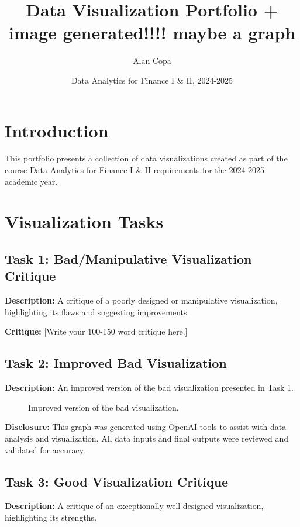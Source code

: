 \documentclass[a4paper,landscape]{article}
\title{Data Visualization Portfolio + image generated!!!! maybe a graph}
\author{Alan Copa}
\date{Data Analytics for Finance I \& II, 2024-2025}
\begin{document}
\maketitle

\tableofcontents
\newpage

\section{Introduction}
This portfolio presents a collection of data visualizations created as part of the course Data Analytics for Finance I \& II requirements for the 2024-2025 academic year.

\section{Visualization Tasks}

\subsection{Task 1: Bad/Manipulative Visualization Critique}
\textbf{Description:} A critique of a poorly designed or manipulative visualization, highlighting its flaws and suggesting improvements.

\textbf{Critique:}
[Write your 100-150 word critique here.]

\subsection{Task 2: Improved Bad Visualization}
\textbf{Description:} An improved version of the bad visualization presented in Task 1.

\begin{figure}[H]
    \centering
    \caption{Improved version of the bad visualization.}
    \label{fig:improved}
\end{figure}

\textbf{Disclosure:} This graph was generated using OpenAI tools to assist with data analysis and visualization. All data inputs and final outputs were reviewed and validated for accuracy.

\subsection{Task 3: Good Visualization Critique}
\textbf{Description:} A critique of an exceptionally well-designed visualization, highlighting its strengths.
\end{document}

